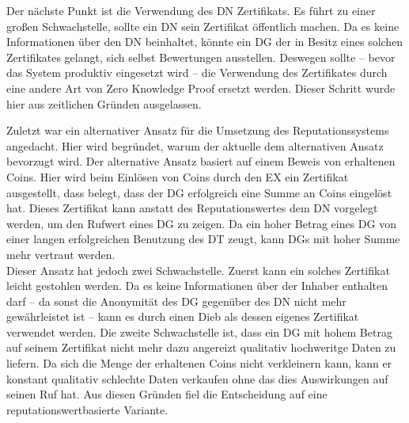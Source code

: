 \documentclass[
	fontsize=11pt,
	headings=small,
	parskip=half,           %
	bibliography=totoc,
	numbers=noenddot,       %
	open=any,               %
]{scrreprt}
\begin{document}
Der nächste Punkt ist die Verwendung des DN Zertifikats. Es führt zu einer großen Schwachstelle, sollte ein DN sein Zertifikat öffentlich machen. Da es keine Informationen über den DN beinhaltet, könnte ein DG der in Besitz eines solchen Zertifikates gelangt, sich selbst Bewertungen ausstellen. Deswegen sollte -- bevor das System produktiv eingesetzt wird -- die Verwendung des Zertifikates durch eine andere Art von Zero Knowledge Proof ersetzt werden. Dieser Schritt wurde hier aus zeitlichen Gründen ausgelassen.

Zuletzt war ein alternativer Ansatz für die Umsetzung des Reputationssystems angedacht. Hier wird begründet, warum der aktuelle dem alternativen Ansatz bevorzugt wird. Der alternative Ansatz basiert auf einem Beweis von erhaltenen Coins. Hier wird beim Einlösen von Coins durch den EX ein Zertifikat ausgestellt, dass belegt, dass der DG erfolgreich eine Summe an Coins eingelöst hat. Dieses Zertifikat kann anstatt des Reputationswertes dem DN vorgelegt werden, um den Rufwert eines DG zu zeigen. Da ein hoher Betrag eines DG von einer langen erfolgreichen Benutzung des DT zeugt, kann DGs mit hoher Summe mehr vertraut werden. \\
Dieser Ansatz hat jedoch zwei Schwachstelle. Zuerst kann ein solches Zertifikat leicht gestohlen werden. Da es keine Informationen über der Inhaber enthalten darf -- da sonst die Anonymität des DG gegenüber des DN nicht mehr gewährleistet ist -- kann es durch einen Dieb als dessen eigenes Zertifikat verwendet werden. Die zweite Schwachstelle ist, dass ein DG mit hohem Betrag auf seinem Zertifikat nicht mehr dazu angereizt qualitativ hochweritge Daten zu liefern. Da sich die Menge der erhaltenen Coins nicht verkleinern kann, kann er konstant qualitativ schlechte Daten verkaufen ohne das dies Auswirkungen auf seinen Ruf hat. Aus diesen Gründen fiel die Entscheidung  auf eine reputationswertbasierte Variante.

\end{document}
